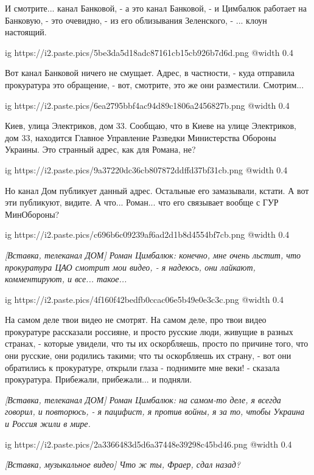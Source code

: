 \begin{multicols}{2}
И смотрите... канал Банковой, - а это канал Банковой, - и Цимбалюк работает на Банковую, - это очевидно, - 
из его облизывания Зеленского, - ... клоун настоящий. 

\ifcmt
  ig https://i2.paste.pics/5be3da5d18adc87161cb15cb926b7d6d.png
  @width 0.4
\fi

Вот канал Банковой ничего не смущает. Адрес, в частности, - куда отправила прокуратура
это обращение, - вот, смотрите, это же они разместили. Смотрим... 

\ifcmt
  ig https://i2.paste.pics/6ea2795bbf4ac94d89c1806a2456827b.png
  @width 0.4
\fi

Киев, улица Электриков, дом 33. Сообщаю, что в Киеве на улице Электриков, дом
33, находится Главное Управление Разведки Министерства Обороны Украины. Это
странный адрес, как для Романа, не? 

\ifcmt
  ig https://i2.paste.pics/9a37220dc36cb807872ddffd37bf31cb.png
  @width 0.4
\fi

Но канал Дом публикует данный адрес. Остальные его замазывали, кстати. А вот эти публикуют, видите.
А что... Роман... что его связывает вообще с ГУР МинОбороны? 

\ifcmt
  ig https://i2.paste.pics/c696b6c09239af6ad2d1b8d4554bf7cb.png
  @width 0.4
\fi

{\em\color{blue}
[Вставка, телеканал ДОМ]
Роман Цимбалюк: конечно, мне очень льстит, что прокуратура ЦАО смотрит мои видео, - 
я надеюсь, они лайкают, комментируют, и все... такое...
}

\ifcmt
  ig https://i2.paste.pics/4f160f42bedfb0ccac06e5b49e0e3c3c.png
  @width 0.4
\fi

На самом деле твои видео не смотрят. На самом деле, про твои видео прокуратуре 
рассказали россияне, и просто русские люди, живущие в разных странах, - которые увидели, что
ты их оскорбляешь, просто по причине того, что они русские, они родились такими; что ты оскорбляешь их страну, - 
вот они обратились к прокуратуре, открыли глаза - поднимите мне веки! - сказала прокуратура. Прибежали, прибежали... 
и подняли. 

{\em\color{blue}
[Вставка, телеканал ДОМ]
Роман Цимбалюк: на самом-то деле, я всегда говорил, и повторюсь, - я пацифист,
я против войны, я за то, чтобы Украина и Россия жили в мире.
}

\ifcmt
  ig https://i2.paste.pics/2a3366483d5d6a37448e39298c45bd46.png
  @width 0.4
\fi

{\em\color{blue}\large
[Вставка, музыкальное видео]
Что ж ты, Фраер, сдал назад?
}


\end{multicols}

